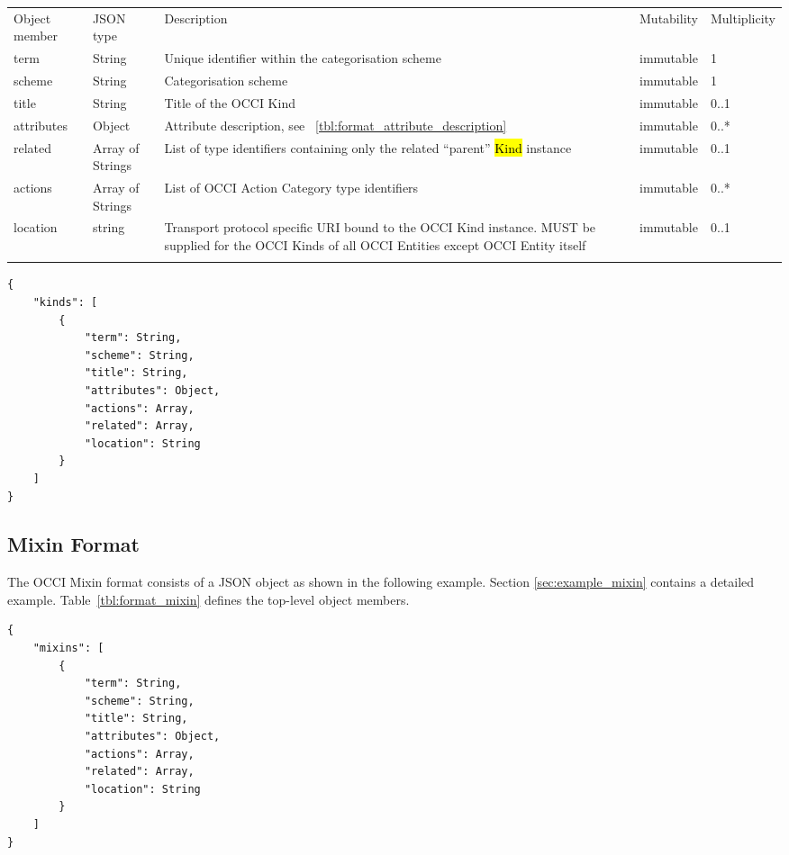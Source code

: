 \documentclass[10pt,a4paper]{article}
\begin{document}
 {
    \begin{tabularx}{\textwidth}{llXll}
    \toprule
    Object member & JSON type & Description & Mutability & Multiplicity \\
    \colrule
    term & String & Unique identifier within the categorisation scheme &
immutable & 1 \\
    scheme & String & Categorisation scheme & immutable & 1 \\
    title & String & Title of the OCCI Kind & immutable & 0..1 \\
    attributes & Object & Attribute description, see
~\ref{tbl:format_attribute_description} & immutable & 0..* \\
    related & Array of Strings & List of type identifiers containing only the
related ``parent'' \hl{Kind} instance & immutable & 0..1 \\
    actions & Array of Strings & List of OCCI Action Category type
identifiers & immutable & 0..* \\
    location & string & Transport protocol specific URI bound to the OCCI Kind
instance. MUST be supplied for the OCCI Kinds of all OCCI Entities except OCCI
Entity itself & immutable & 0..1 \\
    \botrule
    \end{tabularx}
}

\begin{lstlisting}
{
    "kinds": [
        {
            "term": String,
            "scheme": String,
            "title": String,
            "attributes": Object,
            "actions": Array,
            "related": Array,
            "location": String
        }
    ]
}
\end{lstlisting}

\subsection{Mixin Format}
\label{sec:format_mixin}

The OCCI Mixin format consists of a JSON object as shown in the following example. Section \ref{sec:example_mixin} contains a detailed example.
Table~\ref{tbl:format_mixin} defines the top-level object members.

\begin{lstlisting}
{
    "mixins": [
        {
            "term": String,
            "scheme": String,
            "title": String,
            "attributes": Object,
            "actions": Array,
            "related": Array,
            "location": String
        }
    ]
}
\end{lstlisting}
\end{document}
